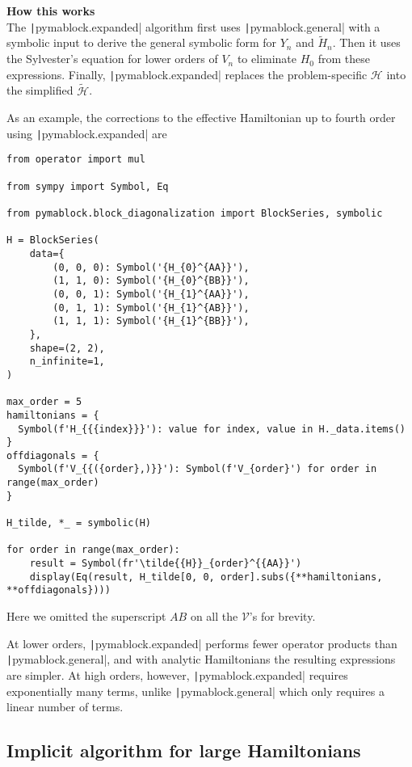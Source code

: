 \begin{framed}
\textbf{How this works}\\
The \texttt|pymablock.expanded| algorithm first uses
\texttt|pymablock.general| with a symbolic input to derive the general
symbolic form for $Y_n$ and $\tilde{H}_n$.
Then it uses the Sylvester's equation for lower orders of $V_n$ to eliminate
$H_0$ from these expressions.
Finally, \texttt|pymablock.expanded| replaces the problem-specific $\mathcal{H}$ into
the simplified $\tilde{\mathcal{H}}$.
\end{framed}

As an example, the corrections to the effective Hamiltonian up to fourth
order using \texttt|pymablock.expanded| are

\begin{verbatim}
from operator import mul

from sympy import Symbol, Eq

from pymablock.block_diagonalization import BlockSeries, symbolic

H = BlockSeries(
    data={
        (0, 0, 0): Symbol('{H_{0}^{AA}}'),
        (1, 1, 0): Symbol('{H_{0}^{BB}}'),
        (0, 0, 1): Symbol('{H_{1}^{AA}}'),
        (0, 1, 1): Symbol('{H_{1}^{AB}}'),
        (1, 1, 1): Symbol('{H_{1}^{BB}}'),
    },
    shape=(2, 2),
    n_infinite=1,
)

max_order = 5
hamiltonians = {
  Symbol(f'H_{{{index}}}'): value for index, value in H._data.items()
}
offdiagonals = {
  Symbol(f'V_{{({order},)}}'): Symbol(f'V_{order}') for order in range(max_order)
}

H_tilde, *_ = symbolic(H)

for order in range(max_order):
    result = Symbol(fr'\tilde{{H}}_{order}^{{AA}}')
    display(Eq(result, H_tilde[0, 0, order].subs({**hamiltonians, **offdiagonals})))
\end{verbatim}

Here we omitted the superscript $AB$ on all the $\mathcal{V}$'s for brevity.

At lower orders, \texttt|pymablock.expanded| performs fewer operator
products than \texttt|pymablock.general|, and with analytic Hamiltonians
the resulting expressions are simpler.
At high orders, however, \texttt|pymablock.expanded| requires exponentially
many terms, unlike \texttt|pymablock.general| which only requires a linear
number of terms.

\subsection{Implicit algorithm for large Hamiltonians}

